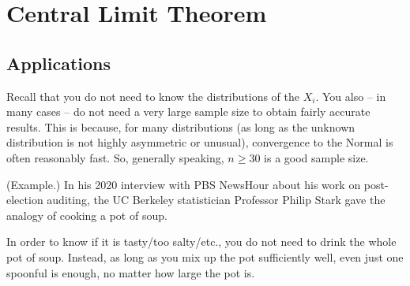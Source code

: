 \documentclass[letterpaper]{article}
\begin{document}
\section{Central Limit Theorem}
\subsection{Applications}
Recall that you do not need to know the distributions of the $X_i$. You also -- in many cases -- do not need a very large sample size to obtain fairly accurate results. This is because, for many distributions (as long as the unknown distribution is not highly asymmetric or unusual), convergence to the Normal is often reasonably fast. So, generally speaking, $n \geq 30$ is a good sample size. 

\begin{mdframed}[]
    (Example.) In his 2020 interview with PBS NewsHour about his work on post-election auditing, the UC Berkeley statistician Professor Philip Stark gave the analogy of cooking a pot of soup. 

    \bigskip 

    In order to know if it is tasty/too salty/etc., you do not need to drink the whole pot of soup. Instead, as long as you mix up the pot sufficiently well, even just one spoonful is enough, no matter how large the pot is. 
\end{mdframed}
\end{document}
